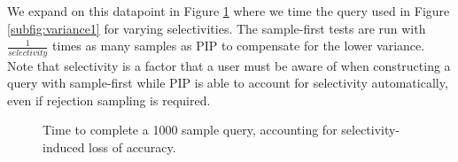 We expand on this datapoint in Figure \ref{fig:scaling_selectivity} where we time the query used in Figure \ref{subfig:variance1} for varying selectivities.  The sample-first tests are run with $\frac{1}{selectivity}$ times as many samples as PIP to compensate for the lower variance.  Note that selectivity is a factor that a user must be aware of when constructing a query with sample-first while PIP is able to account for selectivity automatically, even if rejection sampling is required.

\begin{figure}
\begin{center}
\caption{Time to complete a 1000 sample query, accounting for selectivity-induced loss of accuracy.}
\label{fig:scaling_selectivity}
\end{center}
\end{figure}

%
%

